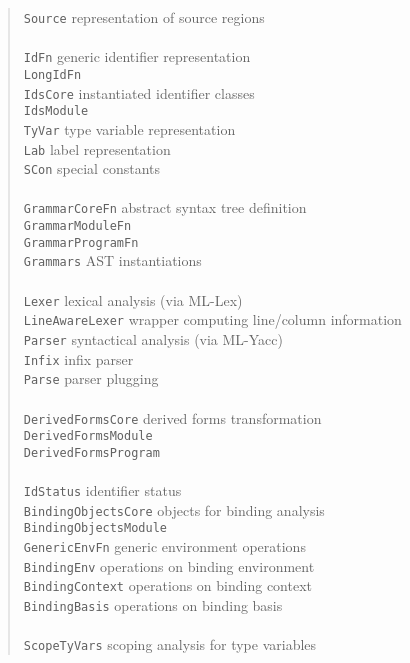 \documentclass[twoside,titlepage]{article}
\begin{document}
\begin{quote}
\begin{tabbing}
{\tt Source}		\> representation of source regions \\
\\
{\tt IdFn}		\> generic identifier representation \\
{\tt LongIdFn}		\> \\
{\tt IdsCore}		\> instantiated identifier classes \\
{\tt IdsModule}		\> \\
{\tt TyVar}		\> type variable representation \\
{\tt Lab}		\> label representation \\
{\tt SCon}		\> special constants \\
\\
{\tt GrammarCoreFn}	\> abstract syntax tree definition \\
{\tt GrammarModuleFn}	\> \\
{\tt GrammarProgramFn}	\> \\
{\tt Grammars}		\> AST instantiations \\
\\
{\tt Lexer}		\> lexical analysis (via ML-Lex) \\
{\tt LineAwareLexer}	\> wrapper computing line/column information \\
{\tt Parser}		\> syntactical analysis (via ML-Yacc) \\
{\tt Infix}		\> infix parser \\
{\tt Parse}		\> parser plugging \\
\\
{\tt DerivedFormsCore}	\> derived forms transformation \\
{\tt DerivedFormsModule} \> \\
{\tt DerivedFormsProgram} \> \\
\\
{\tt IdStatus}		\> identifier status \\
{\tt BindingObjectsCore} \> objects for binding analysis \\
{\tt BindingObjectsModule} \> \\
{\tt GenericEnvFn}	\> generic environment operations \\
{\tt BindingEnv}	\> operations on binding environment \\
{\tt BindingContext}	\> operations on binding context \\
{\tt BindingBasis}	\> operations on binding basis \\
\\
{\tt ScopeTyVars}	\> scoping analysis for type variables\\

\end{tabbing}
\end{quote}
\end{document}
